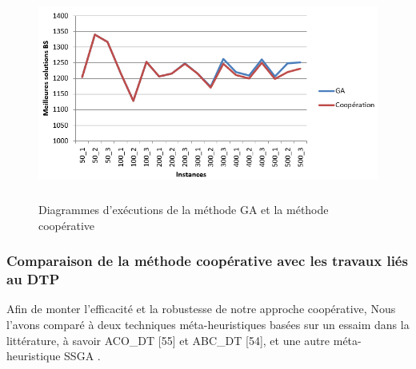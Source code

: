 \begin{enumerate}[label=\alph*)]
\begin{figure}[H]
	\centering
	\includegraphics[width=16cm,height=7cm]{Chap5/4.png}
	\caption{Diagrammes d’exécutions de la méthode GA et la méthode coopérative}
	\label{fig:DEMGAMC}
\end{figure}


\end{enumerate}


\subsubsection{Comparaison de la méthode coopérative avec les travaux liés au DTP}
Afin de monter l’efficacité et la robustesse de notre approche coopérative, Nous l’avons comparé à deux techniques méta-heuristiques basées sur un essaim dans la littérature, à savoir ACO\_DT [55] et ABC\_DT [54], et une autre méta-heuristique SSGA \cite{sundar2014steady} .


